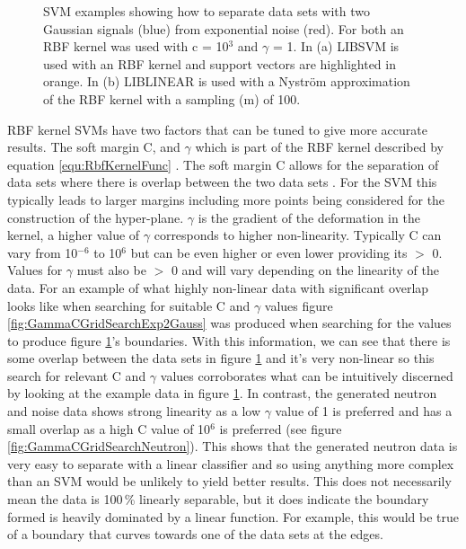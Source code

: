 \begin{figure}[!h]
\begin{subfigure}{.5\textwidth}
  \captionsetup{width=.9\linewidth}
  \caption{}
  \label{subFig:exp_2NysGaussExample}
\end{subfigure}
\caption{SVM examples showing how to separate data sets with two Gaussian signals (blue) from exponential noise (red). For both an RBF kernel was used with c = 10$^3$ and $\gamma$ = 1. In (a) LIBSVM is used with an RBF kernel and support vectors are highlighted in orange. In (b) LIBLINEAR is used with a Nyström approximation of the RBF kernel with a sampling (m) of 100.}
\label{fig:svmExp_GausseExamples}
\end{figure}

RBF kernel SVMs have two factors that can be tuned to give more accurate results. The soft margin C, and $\gamma$ which is part of the RBF kernel described by equation \ref{equ:RbfKernelFunc} \cite{Boser92atraining}. The soft margin C allows for the separation of data sets where there is overlap between the two data sets \cite{cortes1995support}. For the SVM this typically leads to larger margins including more points being considered for the construction of the hyper-plane. $\gamma$ is the gradient of the deformation in the kernel, a higher value of $\gamma$ corresponds to higher non-linearity. Typically C can vary from 10$^{-6}$ to 10$^6$ but can be even higher or even lower providing its $>$ 0. Values for $\gamma$ must also be $>$ 0 and will vary depending on the linearity of the data. For an example of what highly non-linear data with significant overlap looks like when searching for suitable C and $\gamma$ values figure \ref{fig:GammaCGridSearchExp2Gauss} was produced when searching for the values to produce figure \ref{subFig:exp_2NysGaussExample}'s boundaries. With this information, we can see that there is some overlap between the data sets  in figure \ref{subFig:exp_2NysGaussExample} and it's very non-linear so this search for relevant C and $\gamma$ values corroborates what can be intuitively discerned by looking at the example data in figure \ref{subFig:exp_2NysGaussExample}. In contrast, the generated neutron and noise data shows strong linearity as a low $\gamma$ value of 1 is preferred and has a small overlap as a high C value of 10$^6$ is preferred (see figure \ref{fig:GammaCGridSearchNeutron}). This shows that the generated neutron data is very easy to separate with a linear classifier and so using anything more complex than an SVM would be unlikely to yield better results. This does not necessarily mean the data is 100\,\% linearly separable, but it does indicate the boundary formed is heavily dominated by a linear function. For example, this would be true of a boundary that curves towards one of the data sets at the edges. 

